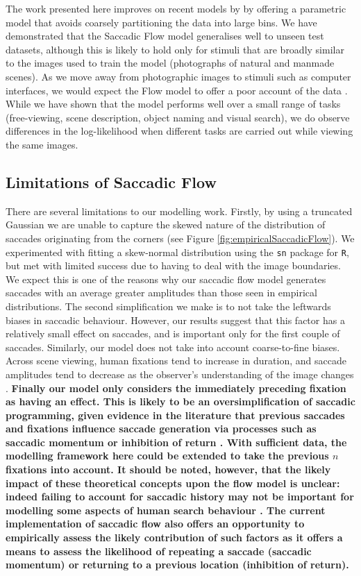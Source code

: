 \documentclass[a4paper, twocolumn, oneside, 11pt]{article}
\begin{document}
The work presented here improves on recent models by \cite{clarke2016,leMeur-coutrot2016} by offering a parametric model that avoids coarsely partitioning the data into large bins. We have demonstrated that the Saccadic Flow model generalises well to unseen test datasets, although this is likely to hold only for stimuli that are broadly similar to the images used to train the model (photographs of natural and manmade scenes). As we move away from photographic images to stimuli such as computer interfaces, we would expect the Flow model to offer a poor account of the data \citep{leMeur-coutrot2016}. While we have shown that the model performs well over a small range of tasks (free-viewing, scene description, object naming and visual search), we do observe differences in the log-likelihood when different tasks are carried out while viewing the same images. 

\subsection{Limitations of Saccadic Flow}

There are several limitations to our modelling work. Firstly, by using a truncated Gaussian we are unable to capture the skewed nature of the distribution of saccades originating from the corners (see Figure  \ref{fig:empiricalSaccadicFlow}). We experimented with fitting a skew-normal distribution using the \texttt{sn} package for \texttt{R}, but met with limited success due to having to deal with the image boundaries. We expect this is one of the reasons why our saccadic flow model generates saccades with an average greater amplitudes than those seen in empirical distributions.  The second simplification we make is to not take the leftwards biases in saccadic behaviour. However, our results suggest that this factor has a relatively small effect on saccades, and is important only for the first couple of saccades. Similarly, our model does not take into account coarse-to-fine biases. Across scene viewing, human fixations tend to increase in duration, and saccade amplitudes tend to decrease as the observer's understanding of the image changes \citep{antes1974}. \textbf{Finally our model only considers the immediately preceding fixation as having an effect. This is likely to be an oversimplification of saccadic programming, given evidence in the literature that previous saccades and fixations influence saccade generation via processes such as saccadic momentum or inhibition of return \citep{macinnes2014}. With sufficient data, the modelling framework here could be extended to take the previous $n$ fixations into account. It should be noted, however, that the likely impact of these theoretical concepts upon the flow model is unclear: indeed failing to account for saccadic history may not be important for modelling some aspects of human search behaviour \citep{clarke2016}. The current implementation of saccadic flow also offers an opportunity to empirically assess the likely contribution of such factors as it offers a means to assess the likelihood of repeating a saccade (saccadic momentum) or returning to a previous location (inhibition of return).}
\end{document}
